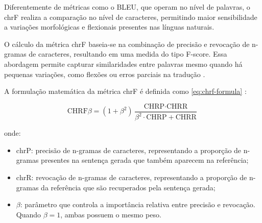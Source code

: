     Diferentemente de métricas como o BLEU, que operam no nível de palavras, o chrF realiza a comparação no nível de caracteres, permitindo maior sensibilidade a variações morfológicas e flexionais presentes nas línguas naturais.

    O cálculo da métrica chrF baseia-se na combinação de precisão e revocação de n-gramas de caracteres, resultando em uma medida do tipo F-score. Essa abordagem permite capturar similaridades entre palavras mesmo quando há pequenas variações, como flexões ou erros parciais na tradução 
    \cite{emergentmind2026chrf}.


    A formulação matemática da métrica chrF é definida como \ref{eq:chrf-formula} \cite{popovic2015chrf}:
    
    \begin{equation}
    \text{CHRF}\beta = (1 + \beta^2) \frac{\text{CHRP} \cdot \text{CHRR}}{\beta^2 \cdot \text{CHRP} + \text{CHRR}}
    \label{eq:chrf-formula}
    \end{equation}

onde:

\begin{itemize}
    \item \(\text{chrP}\): precisão de n-gramas de caracteres, representando a proporção de n-gramas presentes na sentença gerada que também aparecem na referência;
    
    \item \(\text{chrR}\): revocação de n-gramas de caracteres, representando a proporção de n-gramas da referência que são recuperados pela sentença gerada;
    
    \item \(\beta\): parâmetro que controla a importância relativa entre precisão e revocação. Quando \(\beta = 1\), ambas possuem o mesmo peso.
\end{itemize}
